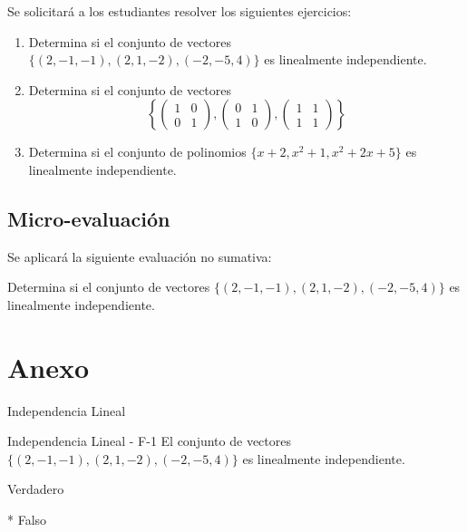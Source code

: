 \documentclass[a4,11pt]{aleph-notas}
\begin{document}
Se solicitará a los estudiantes resolver los siguientes ejercicios:
\begin{enumerate}
    \item 
        Determina si el conjunto de vectores $\{ (2,-1,-1) , (2,1,-2), (-2, -5, 4) \}$ es linealmente independiente.
    \item 
        Determina si el conjunto de vectores 
        \[
            \left\{ 
                \begin{pmatrix}
                    1 & 0 \\
                    0 & 1
                \end{pmatrix},
                \begin{pmatrix}
                    0 & 1 \\
                    1 & 0
                \end{pmatrix},
                \begin{pmatrix}
                    1 & 1 \\
                    1 & 1
                \end{pmatrix}
            \right\}
        \]
    \item 
        Determina si el conjunto de polinomios $\{ x + 2, x^2 + 1, x^2 +2x + 5 \}$ es linealmente independiente.
\end{enumerate}

\subsection{Micro-evaluación}

Se aplicará la siguiente evaluación no sumativa:

    Determina si el conjunto de vectores $\{ (2,-1,-1) , (2,1,-2), (-2, -5, 4) \}$ es linealmente independiente.

\section*{Anexo}

\begin{quiz}{Independencia Lineal}

\begin{multi}[numbering = none, shuffle = false]%
    {Independencia Lineal - F-1}
    El conjunto de vectores $\{ (2,-1,-1) , (2,1,-2), (-2, -5, 4) \}$ es linealmente independiente.
    \item[] Verdadero 
    \item[]* Falso
\end{multi}

\end{quiz}
\end{document}
